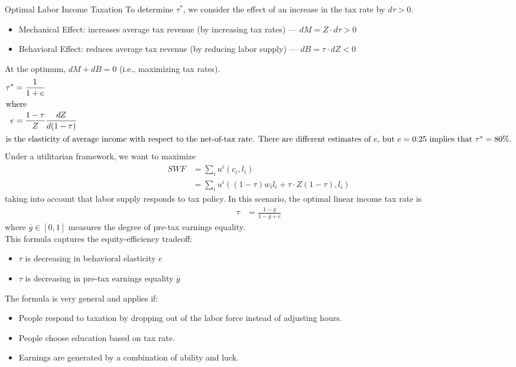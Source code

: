 \documentclass[10pt]{extarticle}
\begin{document}
\begin{problem}{Optimal Labor Income Taxation}
    To determine $\tau^{\ast}$, we consider the effect of an increase in the tax rate by $d\tau > 0$.
    \begin{itemize}
      \item Mechanical Effect: increases average tax revenue (by increasing tax rates) --- $dM = Z\cdot d\tau > 0$
      \item Behavioral Effect: reduces average tax revenue (by reducing labor supply) --- $dB = \tau \cdot dZ < 0$
    \end{itemize}
    At the optimum, $dM + dB = 0$ (i.e., maximizing tax rates).
    \begin{align*}
      \tau^{\ast} &= \frac{1}{1+e}\\
      \shortintertext{where}
      e &= \frac{1-\tau}{Z}\frac{dZ}{d(1-\tau)}\\
      \shortintertext{is the elasticity of average income with respect to the net-of-tax rate. There are different estimates of $e$, but $e = 0.25$ implies that $\tau^{\ast} = 80\%$.}
    \end{align*}
    Under a utilitarian framework, we want to maximize
    \begin{align*}
      SWF &= \sum_{i}u^i(c_i,l_i)\\
          &= \sum_{i}u^i\left((1-\tau)w_il_i + \tau\cdot Z(1-\tau), l_i\right)
    \end{align*}
    taking into account that labor supply responds to tax policy. In this scenario, the optimal linear income tax rate is
    \begin{align*}
      \tau &= \frac{1-\overline{g}}{1-\overline{g} + e}
    \end{align*}
    where $\overline{g} \in [0,1]$ measures the degree of pre-tax earnings equality.\\

    This formula captures the equity-efficiency tradeoff:
    \begin{itemize}
      \item $\tau$ is decreasing in behavioral elasticity $e$
      \item $\tau$ is decreasing in pre-tax earnings equality $\overline{g}$
    \end{itemize}
    The formula is very general and applies if:
    \begin{itemize}
      \item People respond to taxation by dropping out of the labor force instead of adjusting hours.
      \item People choose education based on tax rate.
      \item Earnings are generated by a combination of ability and luck.
    \end{itemize}
  \end{problem}
\end{document}
